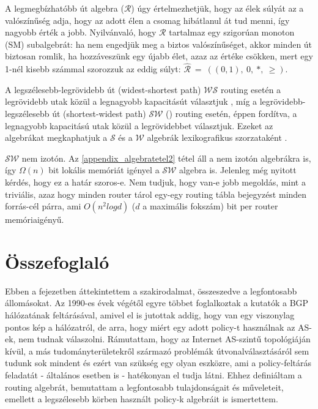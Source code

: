   A legmegbízhatóbb út algebra ($\mathcal{R}$) úgy értelmezhetjük, hogy az élek súlyát az a valószínűség adja, hogy az adott élen a csomag hibátlanul át tud menni, így nagyobb érték a jobb. Nyilvánvaló, hogy $\mathcal{R}$ tartalmaz egy szigorúan monoton (SM) subalgebrát: ha nem engedjük meg a biztos valószínűséget, akkor minden út biztosan romlik, ha hozzáveszünk egy újabb élet, azaz az értéke csökken, mert egy 1-nél kisebb számmal szorozzuk az eddig súlyt: $\hat{\mathcal{R}}~=~((0,1),~0,~*,~\geq)$.

  A legszélesebb-legrövidebb út (widest-shortest path) $\mathcal{WS}$ routing esetén a legrövidebb utak közül a legnagyobb kapacitásút választjuk \cite{Quality_of_service_based_routing_A_performance_perspective}, míg a legrövidebb-legszélesebb út (shortest-widest path) $\mathcal{SW}$ (\cite{Quality_of_service_routing_for_supporting_multimedia_applications, On_path_selection_for_traffic_with_bandwidth_guarantees}) routing esetén, éppen fordítva, a legnagyobb kapacitású utak közül a legrövidebbet választjuk. Ezeket az algebrákat megkaphatjuk a $\mathcal{S}$ és a $\mathcal{W}$ algebrák lexikografikus szorzataként \cite{Lexicographic_products_in_metarouting}.
  \begin{note}
    $\mathcal{SW}$ nem izotón. Az \eqref{appendix_algebratetel2} tétel áll a nem izotón algebrákra is, így $\Omega(n)$ bit lokális memóriát igényel a $\mathcal{SW}$ algebra is. Jelenleg még nyitott kérdés, hogy ez a határ szoros-e. Nem tudjuk, hogy van-e jobb megoldás, mint a triviális, azaz hogy minden router tárol egy-egy routing tábla bejegyzést minden forrás-cél párra, ami $O(n^2 log d)$ ($d$ a maximális fokszám) bit per router memóriaigényű.
  \end{note}

  \section{Összefoglaló}\label{sect:section_osszefoglalo1}

  Ebben a fejezetben áttekintettem a szakirodalmat, összeszedve a legfontosabb állomásokat. Az 1990-es évek végétől egyre többet foglalkoztak a kutatók a BGP hálózatának feltárásával, amivel el is jutottak addig, hogy van egy viszonylag pontos kép a hálózatról, de arra, hogy miért egy adott policy-t használnak az AS-ek, nem tudnak válaszolni. Rámutattam, hogy az Internet AS-szintű topológiáján kívül, a más tudományterületekről származó problémák útvonalválasztásáról sem tudunk sok mindent és ezért van szükség egy olyan eszközre, ami a policy-feltárás feladatát - általános esetben is - hatékonyan el tudja látni. Ehhez definiáltam a routing algebrát, bemutattam a legfontosabb tulajdonságait és műveleteit, emellett a legszélesebb körben használt policy-k algebráit is ismertettem.
